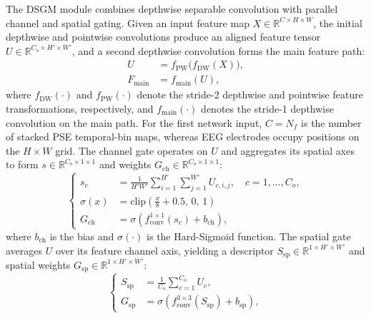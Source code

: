 ﻿\documentclass{nsr}
\begin{document}
The DSGM module combines depthwise separable convolution with parallel channel and spatial gating. Given an input feature map $X \in \mathbb{R}^{C\times H\times W}$, the initial depthwise and pointwise convolutions produce an aligned feature tensor $U\in\mathbb{R}^{C_o\times H'\times W'}$, and a second depthwise convolution forms the main feature path:
\begin{equation}
\begin{aligned}
U &= f_{\mathrm{PW}}\!\bigl(f_{\mathrm{DW}}(X)\bigr),\\
F_{\mathrm{main}} &= f_{\mathrm{main}}(U),
\end{aligned}
\label{eq:dsgm_backbone}
\end{equation}
where $f_{\mathrm{DW}}(\cdot)$ and $f_{\mathrm{PW}}(\cdot)$ denote the stride-2 depthwise and pointwise feature transformations, respectively, and $f_{\mathrm{main}}(\cdot)$ denotes the stride-1 depthwise convolution on the main path. For the first network input, $C=N_f$ is the number of stacked PSE temporal-bin maps, whereas EEG electrodes occupy positions on the $H\times W$ grid. The channel gate operates on $U$ and aggregates its spatial axes to form $s\in\mathbb{R}^{C_o\times1\times1}$ and weights $G_{\mathrm{ch}}\in\mathbb{R}^{C_o\times1\times1}$:
\begin{equation}
\left\{
\begin{aligned}
s_c &= \frac{1}{H'W'}\sum_{i=1}^{H'}\sum_{j=1}^{W'}U_{c,i,j},\quad c=1,\dots,C_o,\\[0.5mm]
\sigma(x) &= \mathrm{clip}\!\left(\frac{x}{8}+0.5,\,0,\,1\right)\\[0.5mm]
G_{\mathrm{ch}} &= \sigma\!\left(f_{\mathrm{conv}}^{1\times1}(s_c)+b_{\mathrm{ch}}\right),
\end{aligned}
\right.
\label{eq:dsgm_ch_gate}
\end{equation}
where $b_{\mathrm{ch}}$ is the bias and $\sigma(\cdot)$ is the Hard-Sigmoid function. The spatial gate averages $U$ over its feature channel axis, yielding a descriptor $S_{\mathrm{sp}}\in\mathbb{R}^{1\times H'\times W'}$ and spatial weights $G_{\mathrm{sp}}\in\mathbb{R}^{1\times H'\times W'}$:
\begin{equation}
\left\{
\begin{aligned}
S_{\mathrm{sp}} &= \frac{1}{C_o}\sum_{c=1}^{C_o}U_c,\\[0.5mm]
G_{\mathrm{sp}} &= \sigma\!\left(f_{\mathrm{conv}}^{3\times3}(S_{\mathrm{sp}})+b_{\mathrm{sp}}\right),
\end{aligned}
\right.
\label{eq:dsgm_sp_gate}
\end{equation}
\end{document}

